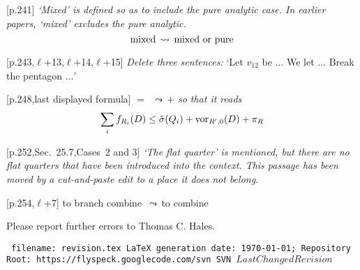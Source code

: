 \documentclass[11pt]{amsart}
\def\svninfo{{\tt
  filename: revision.tex\hfill\break
  LaTeX generation date: \today; \hfill\break
  Repository Root: https://flyspeck.googlecode.com/svn \hfill\break
  SVN $LastChangedRevision$
  }
  }
\def\op#1{{\text{#1}}}
\def\lto{\ensuremath{\,\leadsto\,}}
\def\line{$\ell$}
\def\text{\hbox}
\begin{document}
[p.241]  {\it `Mixed' is defined so as to include
the pure analytic case.  In earlier papers,
`mixed' excludes the pure analytic.  }
	$$
	\text{mixed}\lto\text{mixed or pure}
	$$
	
[p.243,\line+13,\line+14,\line+15]
	{\it Delete three sentences:}
	`Let $v_{12}$ be $\ldots$  We let $\ldots$
	 Break the pentagon $\ldots$'
	
[p.248,last displayed formula]  
	$=$ \lto $+$
{\it so that it reads}
	$$
	\sum_i f_{R_i}(D) \le \hat\sigma(Q_i) +
	\op{vor}_{R',0}(D) + \pi_R
	$$

[p.252,Sec.~25.7,Cases~2 and 3]  {\it `The flat quarter'
is mentioned, but there are no flat quarters
that have been introduced into the context.  
This passage
has been moved by a cut-and-paste edit to a
place it does not belong.}

[p.254,\line+7]
to branch combine \lto to combine

Please report further errors to
Thomas C. Hales.




\bigskip
\svninfo
\end{document}

